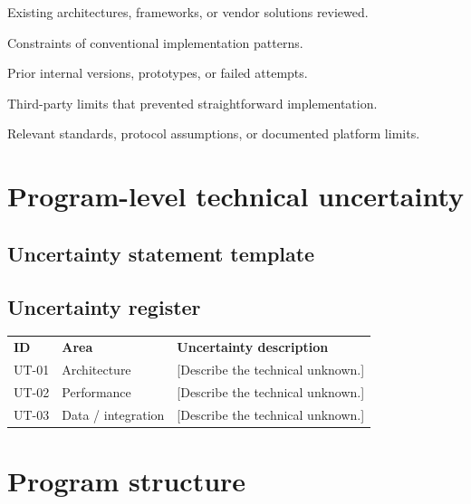 \documentclass[11pt]{article}
\begin{document}
\begin{RDChecklist}
\item Existing architectures, frameworks, or vendor solutions reviewed.
\item Constraints of conventional implementation patterns.
\item Prior internal versions, prototypes, or failed attempts.
\item Third-party limits that prevented straightforward implementation.
\item Relevant standards, protocol assumptions, or documented platform limits.
\end{RDChecklist}

\section{Program-level technical uncertainty}

\subsection{Uncertainty statement template}

\subsection{Uncertainty register}
\begin{xltabular}{\textwidth}{L{2.6cm}L{4.1cm}Y}
\textbf{ID} & \textbf{Area} & \textbf{Uncertainty description} \\
UT-01 & Architecture & {[Describe the technical unknown.]} \\
UT-02 & Performance & {[Describe the technical unknown.]} \\
UT-03 & Data / integration & {[Describe the technical unknown.]} \\
\end{xltabular}

\section{Program structure}
\end{document}
